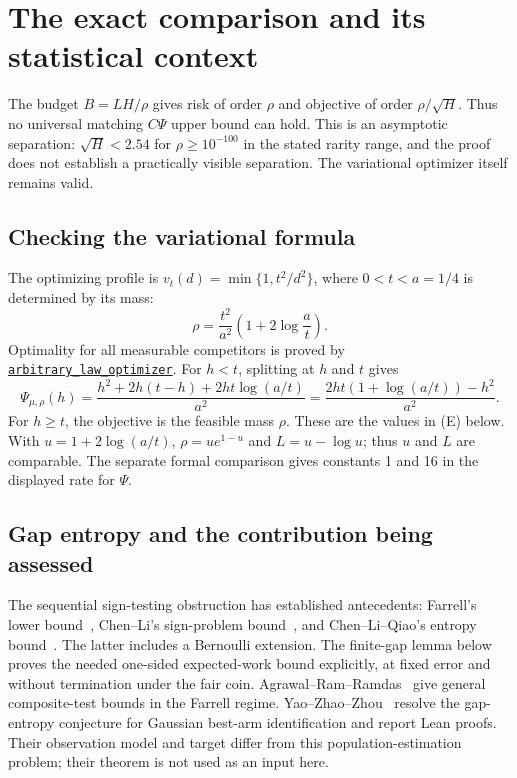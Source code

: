 \documentclass[11pt]{article}
\begin{document}
\section*{The exact comparison and its statistical context}

The budget $B=LH/\rho$ gives risk of order $\rho$ and objective of order
$\rho/\sqrt H$. Thus no universal matching $C\Psi$ upper bound can hold.
This is an asymptotic separation: $\sqrt H<2.54$ for
$\rho\ge10^{-100}$ in the stated rarity range, and the proof does not
establish a practically visible separation. The variational optimizer
itself remains valid.

\subsection*{Checking the variational formula}
The optimizing profile is $v_t(d)=\min\{1,t^2/d^2\}$, where $0<t<a=1/4$
is determined by its mass:
\[
 \rho=\frac{t^2}{a^2}\left(1+2\log\frac at\right).
\]
Optimality for all measurable competitors is proved by
\href{https://github.com/davidiach/adaptive-threshold-estimation/blob/eabf274cb42d4bff4daab6b58568ad6169e7f0a7/lean/ThresholdHC/Tier3/Optimizer.lean}{\nolinkurl{arbitrary\_law\_optimizer}}.
For $h<t$, splitting at $h$ and $t$ gives
\[
 \Psi_{\mu,\rho}(h)=\frac{h^2+2h(t-h)+2ht\log(a/t)}{a^2}
 =\frac{2ht(1+\log(a/t))-h^2}{a^2}.
\]
For $h\ge t$, the objective is the feasible mass $\rho$.
These are the values in (E) below. With $u=1+2\log(a/t)$,
$\rho=ue^{1-u}$ and $L=u-\log u$; thus $u$ and $L$ are comparable.
The separate formal comparison gives constants 1 and 16 in the displayed
rate for $\Psi$.

\subsection*{Gap entropy and the contribution being assessed}
The sequential sign-testing obstruction has established antecedents:
Farrell's lower bound~\cite{farrell}, Chen--Li's sign-problem
bound~\cite{chenli}, and Chen--Li--Qiao's entropy bound~\cite[Lemma 4.1 and
Remark D.4]{clq}. The latter includes a Bernoulli extension. The finite-gap
lemma below proves the needed one-sided expected-work bound explicitly,
at fixed error and without termination under the fair coin.
Agrawal--Ram--Ramdas~\cite{agrawal} give general composite-test bounds in
the Farrell regime. Yao--Zhao--Zhou~\cite{yao} resolve the gap-entropy
conjecture for Gaussian best-arm identification and report Lean proofs.
Their observation model and target differ from this population-estimation
problem; their theorem is not used as an input here.
\end{document}
